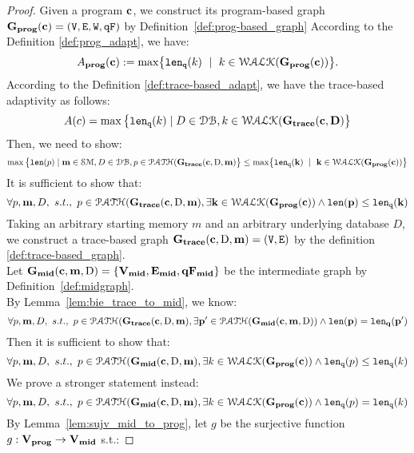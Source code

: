 \section{}
\begin{proof}
Given a program ${\boldsymbol{\mathbf{c}}}$, 
we construct its program-based graph $\mathtt{\bf{G_{prog}}}({\boldsymbol{\mathbf{c}}}) = (\mathtt{V}, \mathtt{E}, \mathtt{W}, \mathtt{qF})$
by Definition~\ref{def:prog-based_graph}
According to the Definition \ref{def:prog_adapt}, we have:
%
\[
  \progA(\ssa{c}) 
  := \max\left\{ \qlen(k)\ \mid \  k\in \walks(\progG(\ssa{c}))\right \}.
\]
%
According to the Definition \ref{def:trace-based_adapt}, we have the trace-based adaptivity as follows:
$$
A(c) = \max \big 
\{ \mathtt{len}_{\tt q}(k) \mid D \in \mathcal{DB} , k \in \mathcal{WALK}(\bf{G_{trace}}(c, D) \big \} 
$$
%
Then, we need to show:
\[
\max \big 
\{ \len(p) \mid \ssa{m} \in \mathcal{SM},D \in \dbdom ,p \in \paths(\traceG(\ssa{c}, \text{D}, \ssa{m}) \big \} 
\leq
\max\left\{ \qlen(k) \ \mid \  k\in \walks(\progG(\ssa{c}))\right \}
\]
%
It is sufficient to show that:
\[
  \forall p, {\boldsymbol{\mathbf{m}}}, D, ~ s.t., ~ p \in \mathcal{PATH}(\bf{G_{trace}}({\boldsymbol{\mathbf{c}}}, \text{D}, {\boldsymbol{\mathbf{m}}}),
  \exists k \in \mathcal{WALK}(\mathtt{\bf{G_{prog}}}({\boldsymbol{\mathbf{c}}})) \land 
  \mathtt{len}(p) \leq \mathtt{len}_{\tt q}(k)
\]
%
Taking an arbitrary starting memory $m$ and an arbitrary underlying database $D$,
we construct a trace-based graph $\bf{G_{trace}}({\boldsymbol{\mathbf{c}}}, \text{D}, {\boldsymbol{\mathbf{m}}}) = (\mathtt{V}, \mathtt{E})$ by the definition \ref{def:trace-based_graph}.
%
\\
%
Let $\mathtt{\bf{G_{mid}}}({\boldsymbol{\mathbf{c}}},{\boldsymbol{\mathbf{m}}},\text{D}) = \{\mathtt{\bf{V_{mid}}}, \mathtt{\bf{E_{mid}}}, \mathtt{\bf{qF_{mid}}}\}$ be the intermediate graph by Definition~\ref{def:midgraph}.
\\
By Lemma~\ref{lem:bie_trace_to_mid}, we know:
\[
  \forall p, {\boldsymbol{\mathbf{m}}}, D, ~ s.t., ~ p \in \mathcal{PATH}(\bf{G_{trace}}({\boldsymbol{\mathbf{c}}}, \text{D}, {\boldsymbol{\mathbf{m}}}),
  \exists p' \in \mathcal{PATH}(\mathtt{\bf{G_{mid}}}({\boldsymbol{\mathbf{c}}},{\boldsymbol{\mathbf{m}}},\text{D})) \land 
  \mathtt{len}(p) = \mathtt{len}_q(p')
\]
%
Then it is sufficient to show that:
%
\[
  \forall p, {\boldsymbol{\mathbf{m}}}, D, ~ s.t., ~ p \in \mathcal{PATH}(\mathtt{\bf{G_{mid}}}({\boldsymbol{\mathbf{c}}}, \text{D}, {\boldsymbol{\mathbf{m}}}),
  \exists k \in \mathcal{WALK}(\mathtt{\bf{G_{prog}}}({\boldsymbol{\mathbf{c}}})) \land 
  \mathtt{len}_{\tt q}(p) \leq \mathtt{len}_{\tt q}(k)
\]
%
We prove a stronger statement instead:
\[
  \forall p, {\boldsymbol{\mathbf{m}}}, D, ~ s.t., ~ p \in \mathcal{PATH}(\mathtt{\bf{G_{mid}}}({\boldsymbol{\mathbf{c}}}, \text{D}, {\boldsymbol{\mathbf{m}}}),
  \exists k \in \mathcal{WALK}(\mathtt{\bf{G_{prog}}}({\boldsymbol{\mathbf{c}}})) \land 
  \mathtt{len}_{\tt q}(p) = \mathtt{len}_{\tt q}(k) 
\]
%
%
By Lemma~\ref{lem:sujv_mid_to_prog}, let $g$ be the surjective function $g: \mathtt{\bf{V_{prog}}} \to \mathtt{\bf{V_{mid}}}$ s.t.:
%

\end{proof}
